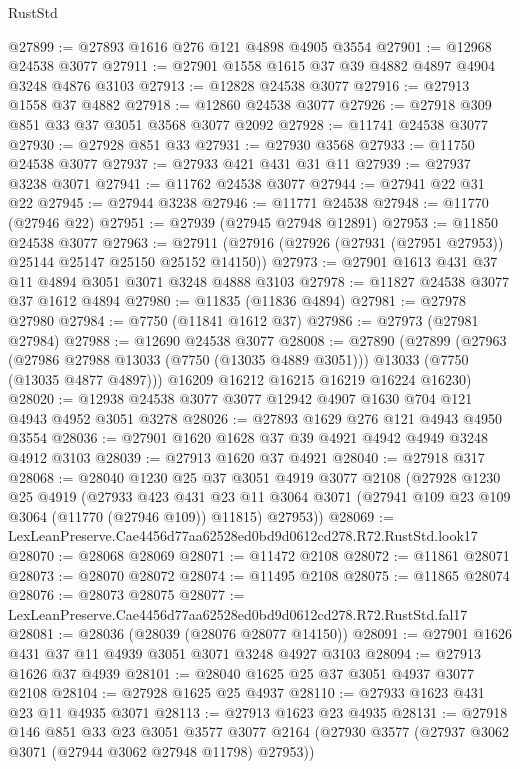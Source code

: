 \begin{lexlean}{RustStd}
\begin{coremodule}
@27899 := @27893 @1616 @276 @121 @4898 @4905 @3554
@27901 := @12968 @24538 @3077
@27911 := @27901 @1558 @1615 @37 @39 @4882 @4897 @4904 @3248 @4876 @3103
@27913 := @12828 @24538 @3077
@27916 := @27913 @1558 @37 @4882
@27918 := @12860 @24538 @3077
@27926 := @27918 @309 @851 @33 @37 @3051 @3568 @3077 @2092
@27928 := @11741 @24538 @3077
@27930 := @27928 @851 @33
@27931 := @27930 @3568
@27933 := @11750 @24538 @3077
@27937 := @27933 @421 @431 @31 @11
@27939 := @27937 @3238 @3071
@27941 := @11762 @24538 @3077
@27944 := @27941 @22 @31 @22
@27945 := @27944 @3238
@27946 := @11771 @24538
@27948 := @11770 (@27946 @22)
@27951 := @27939 (@27945 @27948 @12891)
@27953 := @11850 @24538 @3077
@27963 := @27911 (@27916 (@27926 (@27931 (@27951 @27953)) @25144 @25147 @25150 @25152 @14150))
@27973 := @27901 @1613 @431 @37 @11 @4894 @3051 @3071 @3248 @4888 @3103
@27978 := @11827 @24538 @3077 @37 @1612 @4894
@27980 := @11835 (@11836 @4894)
@27981 := @27978 @27980
@27984 := @7750 (@11841 @1612 @37)
@27986 := @27973 (@27981 @27984)
@27988 := @12690 @24538 @3077
@28008 := @27890
    (@27899
      (@27963
        (@27986 @27988 @13033 (@7750 (@13035 @4889 @3051)))
        @13033
        (@7750 (@13035 @4877 @4897)))
      @16209
      @16212
      @16215
      @16219
      @16224
      @16230)
@28020 := @12938 @24538 @3077 @3077 @12942 @4907 @1630 @704 @121 @4943 @4952 @3051 @3278
@28026 := @27893 @1629 @276 @121 @4943 @4950 @3554
@28036 := @27901 @1620 @1628 @37 @39 @4921 @4942 @4949 @3248 @4912 @3103
@28039 := @27913 @1620 @37 @4921
@28040 := @27918 @317
@28068 := @28040
    @1230
    @25
    @37
    @3051
    @4919
    @3077
    @2108
    (@27928
      @1230
      @25
      @4919
      (@27933
        @423
        @431
        @23
        @11
        @3064
        @3071
        (@27941 @109 @23 @109 @3064 (@11770 (@27946 @109)) @11815)
        @27953))
@28069 := LexLeanPreserve.Cae4456d77aa62528ed0bd9d0612cd278.R72.RustStd.look17
@28070 := @28068 @28069
@28071 := @11472 @2108
@28072 := @11861 @28071
@28073 := @28070 @28072
@28074 := @11495 @2108
@28075 := @11865 @28074
@28076 := @28073 @28075
@28077 := LexLeanPreserve.Cae4456d77aa62528ed0bd9d0612cd278.R72.RustStd.fal17
@28081 := @28036 (@28039 (@28076 @28077 @14150))
@28091 := @27901 @1626 @431 @37 @11 @4939 @3051 @3071 @3248 @4927 @3103
@28094 := @27913 @1626 @37 @4939
@28101 := @28040 @1625 @25 @37 @3051 @4937 @3077 @2108
@28104 := @27928 @1625 @25 @4937
@28110 := @27933 @1623 @431 @23 @11 @4935 @3071
@28113 := @27913 @1623 @23 @4935
@28131 := @27918
    @146
    @851
    @33
    @23
    @3051
    @3577
    @3077
    @2164
    (@27930 @3577 (@27937 @3062 @3071 (@27944 @3062 @27948 @11798) @27953))

\end{coremodule}
\end{lexlean}
